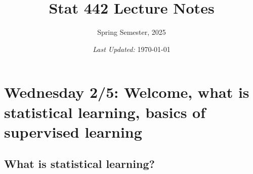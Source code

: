 \documentclass[titlepage,10pt]{scrartcl}
\title{Stat 442 Lecture Notes}
\subtitle{Spring Semester, 2025}
\date{\small\emph{Last Updated:} \today}
\newcommand{\goal}[2]{\item[\IfEqCase{#1}{{0}{{\Large\HollowBox}}{1}{{\Large\CrossedBox}}}] #2}
\newcommand{\logentry}[2]{\paragraph{{#1:}} #2}
\begin{document}
\maketitle

%
%

\hrulefill
\section{Wednesday 2/5: Welcome, what is statistical learning, basics of supervised learning}

\subsection{What is statistical learning?}
\label{sec_veryintro}
\end{document}
